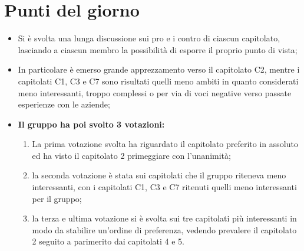 \section{Punti del giorno}
        \begin{itemize}
            \item Si è svolta una lunga discussione sui pro e i contro di ciascun capitolato, lasciando a ciascun membro la possibilità di esporre il proprio punto di vista;
            \item In particolare è emerso grande apprezzamento verso il capitolato C2, mentre i capitolati C1, C3 e C7 sono risultati quelli meno ambiti in quanto considerati meno interessanti, troppo complessi o per via di voci negative verso passate esperienze con le aziende;
            \item \textbf{Il gruppo ha poi svolto 3 votazioni:}
                \begin{enumerate}
                    \item La prima votazione svolta ha riguardato il capitolato preferito in assoluto ed ha visto il capitolato 2 primeggiare con l'unanimità;
                    \item la seconda votazione è stata sui capitolati che il gruppo riteneva meno interessanti, con i capitolati C1, C3 e C7 ritenuti quelli meno interessanti per il gruppo;
                    \item la terza e ultima votazione si è svolta sui tre capitolati più interessanti in modo da stabilire un'ordine di preferenza, vedendo prevalere il capitolato 2 seguito a parimerito dai capitolati 4 e 5.
                \end{enumerate}
        \end{itemize}